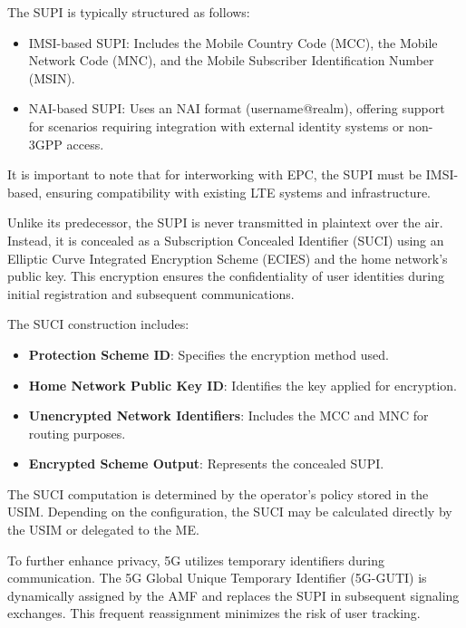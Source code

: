 
The SUPI is typically structured as follows:
\begin{itemize}
    \item {
        IMSI-based SUPI: Includes the Mobile Country Code (MCC), the Mobile Network Code (MNC), and the Mobile Subscriber Identification Number (MSIN).
    }
    \item {
        NAI-based SUPI: Uses an NAI format (username@realm), offering support for scenarios requiring integration with external identity systems or non-3GPP access.
    }
\end{itemize}

It is important to note that for interworking with EPC, the SUPI must be IMSI-based, ensuring compatibility with existing LTE systems and infrastructure.

Unlike its predecessor, the SUPI is never transmitted in plaintext over the air. Instead, it is concealed as a Subscription Concealed Identifier (SUCI) using an Elliptic Curve Integrated Encryption Scheme (ECIES) and the home network’s public key. This encryption ensures the confidentiality of user identities during initial registration and subsequent communications.


The SUCI construction includes:
\begin{itemize}
    \item{
        \textbf{Protection Scheme ID}: Specifies the encryption method used.
    }
    \item{
        \textbf{Home Network Public Key ID}: Identifies the key applied for encryption.
    }
    \item{
        \textbf{Unencrypted Network Identifiers}: Includes the MCC and MNC for routing purposes.
    }
    \item{
        \textbf{Encrypted Scheme Output}: Represents the concealed SUPI.
    }
\end{itemize}

The SUCI computation is determined by the operator's policy stored in the \ac{USIM}. Depending on the configuration, the SUCI may be calculated directly by the \ac{USIM} or delegated to the \ac{ME}.

To further enhance privacy, \ac{5G} utilizes temporary identifiers during communication. The 5G Global Unique Temporary Identifier (5G-GUTI) is dynamically assigned by the \ac{AMF} and replaces the SUPI in subsequent signaling exchanges. This frequent reassignment minimizes the risk of user tracking.

